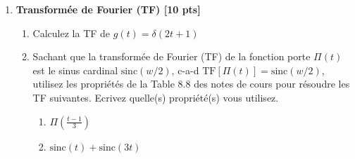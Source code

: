 \documentclass{article}
\begin{document}
\begin{enumerate}
\item {\bf Transformée de Fourier (TF) [10 pts]}
  \begin{enumerate}
    \vspace{0.5cm}

    
  
  \item Calculez la TF de $g(t) = \delta(2t + 1)$
  
    \vspace{1cm}


    \vspace{1cm}

  \item Sachant que la transformée de Fourier (TF) de la fonction
    porte $\Pi(t)$ est le sinus cardinal $\textrm{sinc}(w / 2)$, c-a-d
    $\textrm{TF}[\Pi(t)] = \textrm{sinc}(w/2)$, 
    utilisez les propriétés de la Table 8.8 des notes de cours
    pour résoudre les TF suivantes. 
    Ecrivez quelle(s) propriété(s) vous utilisez.
   \vspace{0.5cm}
    \begin{enumerate}
    \item $\Pi( \frac{t-1}{3} )$
   \vspace{0.5cm}
    \item  $\textrm{sinc}(t) + \textrm{sinc}(3t)$
    \vspace{1cm}
    \end{enumerate}

    \vspace{1cm}

\end{enumerate}


\end{enumerate}
\end{document}
